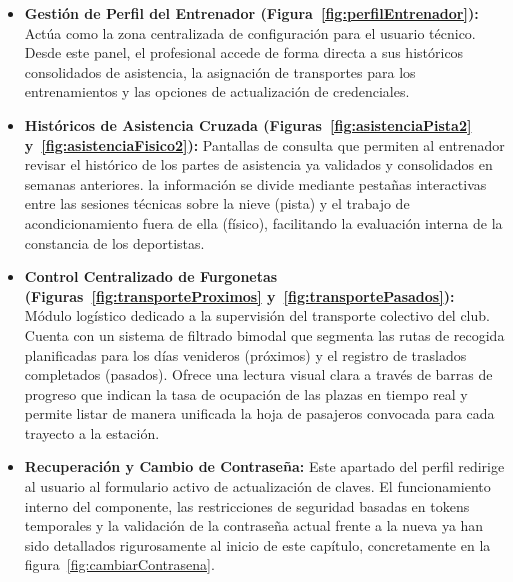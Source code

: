 \begin{itemize}
    \item \textbf{Gestión de Perfil del Entrenador (Figura~\ref{fig:perfilEntrenador}):} Actúa como la zona centralizada de configuración para el usuario técnico. Desde este panel, el profesional accede de forma directa a sus históricos consolidados de asistencia, la asignación de transportes para los entrenamientos y las opciones de actualización de credenciales.
    
    \item \textbf{Históricos de Asistencia Cruzada (Figuras~\ref{fig:asistenciaPista2} y~\ref{fig:asistenciaFisico2}):} Pantallas de consulta que permiten al entrenador revisar el histórico de los partes de asistencia ya validados y consolidados en semanas anteriores. la información se divide mediante pestañas interactivas entre las sesiones técnicas sobre la nieve (pista) y el trabajo de acondicionamiento fuera de ella (físico), facilitando la evaluación interna de la constancia de los deportistas.
    
    \item \textbf{Control Centralizado de Furgonetas (Figuras~\ref{fig:transporteProximos} y~\ref{fig:transportePasados}):} Módulo logístico dedicado a la supervisión del transporte colectivo del club. Cuenta con un sistema de filtrado bimodal que segmenta las rutas de recogida planificadas para los días venideros (próximos) y el registro de traslados completados (pasados). Ofrece una lectura visual clara a través de barras de progreso que indican la tasa de ocupación de las plazas en tiempo real y permite listar de manera unificada la hoja de pasajeros convocada para cada trayecto a la estación.

    \item \textbf{Recuperación y Cambio de Contraseña:} Este apartado del perfil redirige al usuario al formulario activo de actualización de claves. El funcionamiento interno del componente, las restricciones de seguridad basadas en tokens temporales y la validación de la contraseña actual frente a la nueva ya han sido detallados rigurosamente al inicio de este capítulo, concretamente en la figura~\ref{fig:cambiarContrasena}.

\end{itemize}

\newpage
